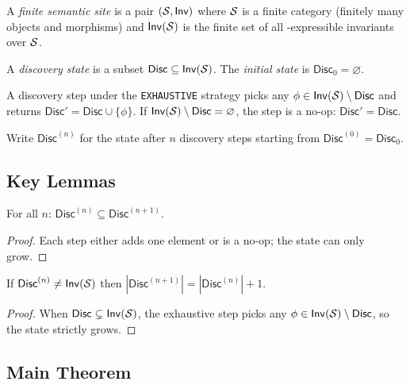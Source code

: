 \documentclass[11pt]{article}
\newcommand{\Disc}{\mathsf{Disc}}          %
\newcommand{\Inv}{\mathsf{Inv}}            %
\newcommand{\alg}[1]{\texttt{\small #1}}   %
\begin{document}
\begin{definition}
A \emph{finite semantic site} is a pair $(\Site, \Inv)$ where
$\mathcal{S}$ is a finite category (finitely many objects and morphisms)
and $\Inv(\Site)$ is the finite set of all \JuGeo{}-expressible
invariants over $\mathcal{S}$.
\end{definition}

\begin{definition}
A \emph{discovery state} is a subset $\Disc \subseteq \Inv(\Site)$.
The \emph{initial state} is $\Disc_0 = \varnothing$.
\end{definition}

\begin{definition}
A discovery step under the \alg{EXHAUSTIVE} strategy picks
any $\phi \in \Inv(\Site) \setminus \Disc$ and returns
$\Disc' = \Disc \cup \{\phi\}$.  If $\Inv(\Site) \setminus \Disc = \varnothing$,
the step is a no-op: $\Disc' = \Disc$.
\end{definition}

\begin{definition}
Write $\Disc^{(n)}$ for the state after $n$ discovery steps starting
from $\Disc^{(0)} = \Disc_0$.
\end{definition}

\subsection{Key Lemmas}

\begin{lemma}[Monotonicity]\label{lem:mono}
For all $n$: $\Disc^{(n)} \subseteq \Disc^{(n+1)}$.
\end{lemma}
\begin{proof}
Each step either adds one element or is a no-op; the state can only grow.
\end{proof}

\begin{lemma}[Progress]\label{lem:progress}
If $\Disc^{(n)} \neq \Inv(\Site)$ then
$|\Disc^{(n+1)}| = |\Disc^{(n)}| + 1$.
\end{lemma}
\begin{proof}
When $\Disc \subsetneq \Inv(\Site)$, the exhaustive step picks
any $\phi \in \Inv(\Site) \setminus \Disc$, so the state strictly grows.
\end{proof}

\subsection{Main Theorem}
\end{document}
